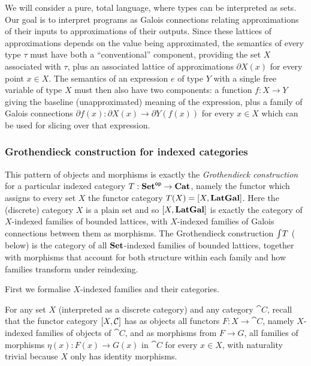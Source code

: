 We will consider a pure, total language, where types can be interpreted as sets. Our goal is to interpret
programs as Galois connections relating approximations of their inputs to approximations of their outputs.
Since these lattices of approximations depends on the value being approximated, the semantics of every type
$\tau$ must have both a ``conventional'' component, providing the set $X$ associated with $\tau$, plus an
associated lattice of approximations $\partial X(x)$ for every point $x \in X$. The semantics of an expression
$e$ of type $Y$ with a single free variable of type $X$ must then also have two components: a function $f: X
\to Y$ giving the baseline (unapproximated) meaning of the expression, plus a family of Galois connections
$\partial f(x): \partial X(x) \to \partial Y(f(x))$ for every $x \in X$ which can be used for slicing over
that expression.

\subsubsection{Grothendieck construction for indexed categories}

This pattern of objects and morphisms is exactly the \emph{Grothendieck construction} for a particular indexed
category $T: \mathbf{Set}^{\mathsf{op}} \to \mathbf{Cat}$, namely the functor which assigns to every set $X$ the functor category $T(X)
= [X,\mathbf{LatGal}]$. Here the (discrete) category $X$ is a plain set and so $[X,\mathbf{LatGal}]$ is exactly
the category of $X$-indexed families of bounded lattices, with $X$-indexed families of Galois connections
between them as morphisms. The Grothendieck construction $\int_{}T$
( below) is the category of all $\mathbf{Set}$-indexed families of bounded lattices,
together with morphisms that account for both structure within each family and how families transform under
reindexing.

First we formalise $X$-indexed families and their categories.

\begin{definition}
\label{def:fam:Fam}
For any set $X$ (interpreted as a discrete category) and any category $\cat{C}$, recall that the functor
category $[X,\mathcal{C}]$ has as objects all functors $F: X \to \cat{C}$, namely $X$-indexed families of
objects of $\cat{C}$, and as morphisms from $F \to G$, all families of morphisms $\eta(x): F(x) \to G(x)$ in
$\cat{C}$ for every $x \in X$, with naturality trivial because $X$ only has identity morphisms.
\end{definition}

